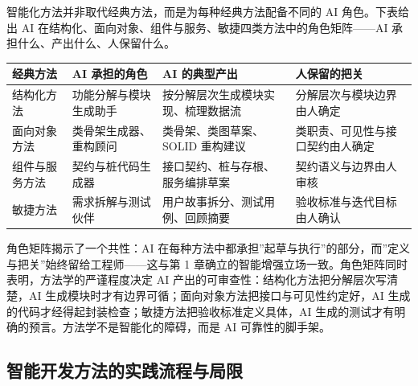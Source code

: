 \documentclass[12pt,a4paper,twoside,openany]{ctexbook}
\numberwithin{figure}{chapter}
\numberwithin{table}{chapter}
\newcounter{none}
\begin{document}
智能化方法并非取代经典方法，而是为每种经典方法配备不同的 AI
角色。下表给出 AI
在结构化、面向对象、组件与服务、敏捷四类方法中的角色矩阵------AI
承担什么、产出什么、人保留什么。

{\def\LTcaptype{none} %
\begin{longtable}[]{@{}
  >{\raggedright\arraybackslash}p{}
  >{\raggedright\arraybackslash}p{}
  >{\raggedright\arraybackslash}p{}
  >{\raggedright\arraybackslash}p{}@{}}
\toprule\noalign{}
\begin{minipage}[b]{\linewidth}\raggedright
经典方法
\end{minipage} & \begin{minipage}[b]{\linewidth}\raggedright
AI 承担的角色
\end{minipage} & \begin{minipage}[b]{\linewidth}\raggedright
AI 的典型产出
\end{minipage} & \begin{minipage}[b]{\linewidth}\raggedright
人保留的把关
\end{minipage} \\
\midrule\noalign{}
\endhead
\bottomrule\noalign{}
\endlastfoot
结构化方法 & 功能分解与模块生成助手 & 按分解层次生成模块实现、梳理数据流
& 分解层次与模块边界由人确定 \\
面向对象方法 & 类骨架生成器、重构顾问 & 类骨架、类图草案、SOLID 重构建议
& 类职责、可见性与接口契约由人确定 \\
组件与服务方法 & 契约与桩代码生成器 & 接口契约、桩与存根、服务编排草案 &
契约语义与边界由人审核 \\
敏捷方法 & 需求拆解与测试伙伴 & 用户故事拆分、测试用例、回顾摘要 &
验收标准与迭代目标由人确认 \\
\end{longtable}
}

角色矩阵揭示了一个共性：AI
在每种方法中都承担''起草与执行''的部分，而''定义与把关''始终留给工程师------这与第
1 章确立的智能增强立场一致。角色矩阵同时表明，方法学的严谨程度决定 AI
产出的可审查性：结构化方法把分解层次写清楚，AI
生成模块时才有边界可循；面向对象方法把接口与可见性约定好，AI
生成的代码才经得起封装检查；敏捷方法把验收标准定义具体，AI
生成的测试才有明确的预言。方法学不是智能化的障碍，而是 AI
可靠性的脚手架。

\subsection{智能开发方法的实践流程与局限}\label{ux667aux80fdux5f00ux53d1ux65b9ux6cd5ux7684ux5b9eux8df5ux6d41ux7a0bux4e0eux5c40ux9650}
\end{document}
